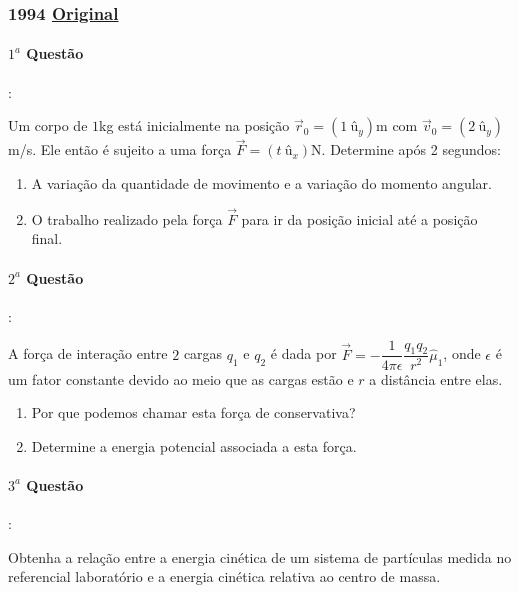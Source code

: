 \documentclass[12pt,a4paper]{article}
\newcommand{\original}[1]{\tiny \href{#1}{Original} \normalsize}
\begin{document}
\newpage
\subsubsection{1994 \original{https://drive.google.com/file/d/1PGEVNaCj3pDNdEnDzYftrAatgyTZyyOB/view?usp=sharing}}

\paragraph{$1^a$ Questão}:

Um corpo de $1$kg está inicialmente na posição $\overrightarrow{r}_0= (1\  \textrm{û}_y)$m com $\overrightarrow{v}_0=(2 \ \textrm{û}_y)$m/s. Ele então
é sujeito a uma força $\overrightarrow{F}= (t \ \textrm{û}_x)$N. Determine após 2 segundos:

\begin{enumerate}[label=\alph*)]
\item A variação da quantidade de movimento e a variação do momento angular.
\item O trabalho realizado pela força $\overrightarrow{F}$ para ir da posição inicial até a posição final.
\end{enumerate} 

\paragraph{$2^a$ Questão}:

A força de interação entre $2$ cargas $q_1$ e $q_2$ é dada por $\overrightarrow{F}=-\dfrac{1}{4\pi \epsilon} \dfrac{q_1 q_2}{r^2}\hat{\mu}_1$, onde $\epsilon$ é um fator constante devido ao meio que as cargas estão e $r$ a distância entre elas.

\begin{enumerate}[label=\alph*)]
\item Por que podemos chamar esta força de conservativa?
\item Determine a energia potencial associada a esta força.
\end{enumerate}

\paragraph{$3^a$ Questão}:

Obtenha a relação entre a energia cinética de um sistema de partículas medida no referencial laboratório e a energia cinética relativa ao centro de massa.
\vspace{0.1cm}
\end{document}
